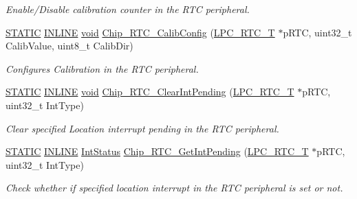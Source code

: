 \begin{DoxyCompactItemize}
\begin{DoxyCompactList}\small\item\em Enable/\-Disable calibration counter in the R\-T\-C peripheral. \end{DoxyCompactList}\item 
\hyperlink{group__LPC__Types__Public__Macros_ga10b2d890d871e1489bb02b7e70d9bdfb}{S\-T\-A\-T\-I\-C} \hyperlink{group__LPC__Types__Public__Types_ga2eb6f9e0395b47b8d5e3eeae4fe0c116}{I\-N\-L\-I\-N\-E} \hyperlink{Paradigm_2Tern__EE_2small_2portmacro_8h_a14d32f8130d3c0b212cfc751730b5b49}{void} \hyperlink{group__RTC__17XX__40XX_ga4f0a93e9a72f793b5891e2d691a1d35d}{Chip\-\_\-\-R\-T\-C\-\_\-\-Calib\-Config} (\hyperlink{structLPC__RTC__T}{L\-P\-C\-\_\-\-R\-T\-C\-\_\-\-T} $\ast$p\-R\-T\-C, uint32\-\_\-t Calib\-Value, uint8\-\_\-t Calib\-Dir)
\begin{DoxyCompactList}\small\item\em Configures Calibration in the R\-T\-C peripheral. \end{DoxyCompactList}\item 
\hyperlink{group__LPC__Types__Public__Macros_ga10b2d890d871e1489bb02b7e70d9bdfb}{S\-T\-A\-T\-I\-C} \hyperlink{group__LPC__Types__Public__Types_ga2eb6f9e0395b47b8d5e3eeae4fe0c116}{I\-N\-L\-I\-N\-E} \hyperlink{Paradigm_2Tern__EE_2small_2portmacro_8h_a14d32f8130d3c0b212cfc751730b5b49}{void} \hyperlink{group__RTC__17XX__40XX_gaa43865e87cf61d579a4ee52a307b3e30}{Chip\-\_\-\-R\-T\-C\-\_\-\-Clear\-Int\-Pending} (\hyperlink{structLPC__RTC__T}{L\-P\-C\-\_\-\-R\-T\-C\-\_\-\-T} $\ast$p\-R\-T\-C, uint32\-\_\-t Int\-Type)
\begin{DoxyCompactList}\small\item\em Clear specified Location interrupt pending in the R\-T\-C peripheral. \end{DoxyCompactList}\item 
\hyperlink{group__LPC__Types__Public__Macros_ga10b2d890d871e1489bb02b7e70d9bdfb}{S\-T\-A\-T\-I\-C} \hyperlink{group__LPC__Types__Public__Types_ga2eb6f9e0395b47b8d5e3eeae4fe0c116}{I\-N\-L\-I\-N\-E} \hyperlink{group__LPC__Types__Public__Types_gab7d263072f745b4f3913fb0afc434c4e}{Int\-Status} \hyperlink{group__RTC__17XX__40XX_gaab21524984ac344d4f508d2dfd6c5098}{Chip\-\_\-\-R\-T\-C\-\_\-\-Get\-Int\-Pending} (\hyperlink{structLPC__RTC__T}{L\-P\-C\-\_\-\-R\-T\-C\-\_\-\-T} $\ast$p\-R\-T\-C, uint32\-\_\-t Int\-Type)
\begin{DoxyCompactList}\small\item\em Check whether if specified location interrupt in the R\-T\-C peripheral is set or not. \end{DoxyCompactList}\item 

\end{DoxyCompactItemize}
